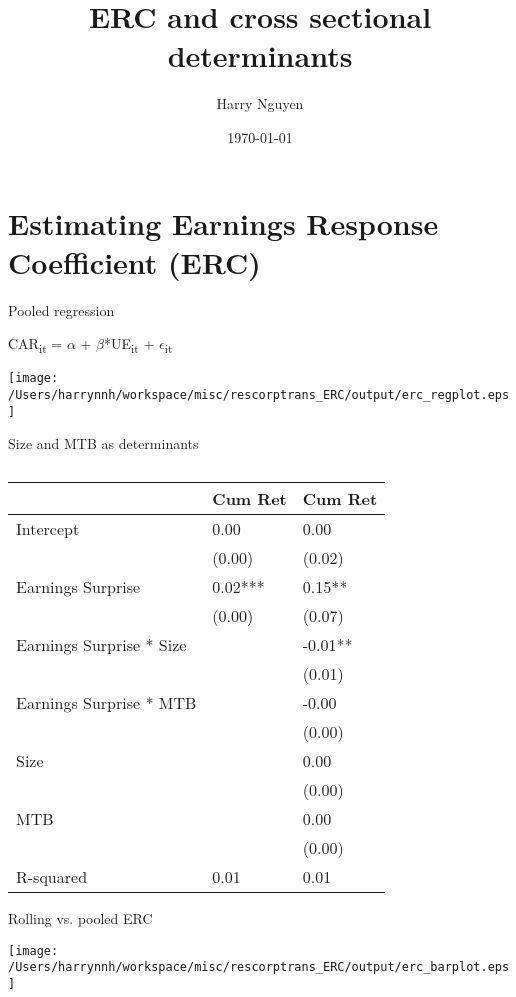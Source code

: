 \documentclass[bigger,allowframebreaks]{beamer}
\institute[UM]{Maastricht University}
\author{Harry Nguyen}
\date{\today}
\title{ERC and cross sectional determinants}
\begin{document}
\maketitle
\section{Estimating Earnings Response Coefficient (ERC)}
\label{sec:org0c3c4ed}
\begin{frame}[label={sec:org168aea2}]{Pooled regression}
\begin{center}
CAR\textsubscript{it} = \(\alpha\) + \(\beta\)*UE\textsubscript{it} + \(\epsilon\)\textsubscript{it}
\end{center}
\begin{center}
\texttt{[image: /Users/harrynnh/workspace/misc/rescorptrans\_ERC/output/erc\_regplot.eps]}
\end{center}
\end{frame}
\begin{frame}[label={sec:org4992575},shrink=15]{Size and MTB as determinants}
\begin{table}
\caption{}
\label{}
\begin{center}
\begin{tabular}{lll}
\hline
                         & Cum Ret  & Cum Ret    \\
\hline
Intercept                & 0.00     & 0.00       \\
                         & (0.00)   & (0.02)     \\
Earnings Surprise        & 0.02***  & 0.15**     \\
                         & (0.00)   & (0.07)     \\
Earnings Surprise * Size &          & -0.01**    \\
                         &          & (0.01)     \\
Earnings Surprise * MTB  &          & -0.00      \\
                         &          & (0.00)     \\
Size                     &          & 0.00       \\
                         &          & (0.00)     \\
MTB                      &          & 0.00       \\
                         &          & (0.00)     \\
R-squared                & 0.01     & 0.01       \\
\hline
\end{tabular}
\end{center}
\end{table}
\end{frame}
\begin{frame}[label={sec:orgadc35a5}]{Rolling vs. pooled ERC}
\begin{center}
\texttt{[image: /Users/harrynnh/workspace/misc/rescorptrans\_ERC/output/erc\_barplot.eps]}
\end{center}
\end{frame}
\end{document}
